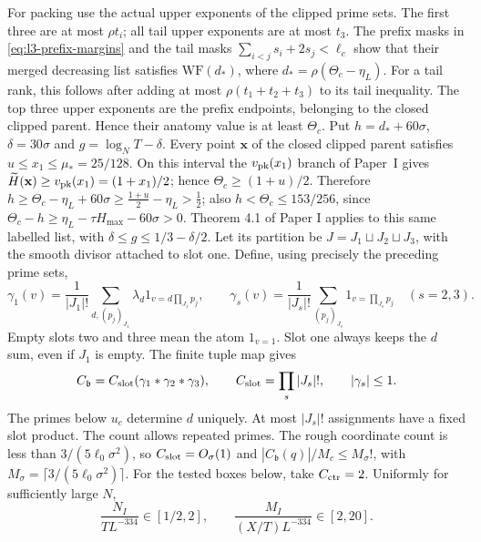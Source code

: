 For packing use the actual upper exponents of the clipped prime sets.
The first three are at most $\rho t_i$; all tail upper exponents are
at most $t_3$. The prefix masks in \eqref{eq:l3-prefix-margins}
and the tail masks $\sum_{i<j}s_i+2s_j<\ell_c$ show that their
merged decreasing list satisfies $\mathrm{WF}(d_*)$, where
$d_*=\rho(\Theta_c-\eta_L)$. For a tail rank, this follows after
adding at most $\rho(t_1+t_2+t_3)$ to its tail inequality.
The top three upper exponents are the prefix endpoints, belonging to
the closed clipped parent. Hence their anatomy value is at least
$\Theta_c$. Put $h=d_*+60\sigma$, $\delta=30\sigma$ and
$g=\log_N T-\delta$.
Every point $\mathbf x$ of the closed clipped parent satisfies
$u\le x_1\le\mu_*=25/128$. On this interval the $v_{\rm pk}(x_1)$ branch of
Paper~I gives $\widetilde H(\mathbf x)\ge v_{\rm pk}(x_1)=(1+x_1)/2$;
hence $\Theta_c\ge(1+u)/2$. Therefore
 $h\ge\Theta_c-\eta_L+60\sigma
 \ge\frac{1+u}{2}-\eta_L>\frac12$; also
 $h<\Theta_c\le153/256$, since
$\Theta_c-h\ge\eta_L-\tau H_{\max}-60\sigma>0$.
Theorem 4.1 of Paper I applies to this same labelled list, with
$\delta\le g\le1/3-\delta/2$. Let its partition be
$J=J_1\sqcup J_2\sqcup J_3$, with the smooth divisor attached to
slot one. Define, using precisely the preceding prime sets,
\[
 \gamma_1(v)=\frac1{|J_1|!}\sum_{d,(p_j)_{J_1}}
             \lambda_d1_{v=d\prod_{J_1}p_j},\qquad
 \gamma_s(v)=\frac1{|J_s|!}\sum_{(p_j)_{J_s}}
             1_{v=\prod_{J_s}p_j}\quad(s=2,3).
\]
Empty slots two and three mean the atom $1_{v=1}$. Slot one always
keeps the $d$ sum, even if $J_1$ is empty. The finite tuple map gives
\[
 C_{\mathfrak b}=C_{\rm slot}(\gamma_1*\gamma_2*\gamma_3),\qquad
 C_{\rm slot}=\prod_s|J_s|!,\qquad |\gamma_s|\le1.
\]
The primes below $u_c$ determine $d$ uniquely. At most $|J_s|!$
assignments have a fixed slot product. The count allows repeated primes.
The rough coordinate count is less than $3/(5\ell_0\sigma^2)$,
so $C_{\rm slot}=O_\sigma(1)$ and
$|C_{\mathfrak b}(q)|/M_c\le M_\sigma!$, with
$M_\sigma=\lceil3/(5\ell_0\sigma^2)\rceil$.
For the tested boxes below, take $C_{\rm ctr}=2$. Uniformly for
sufficiently large $N$,
\[
 \frac{N_I}{TL^{-334}}\in[1/2,2],\qquad
 \frac{M_I}{(X/T)L^{-334}}\in[2,20].
\]

